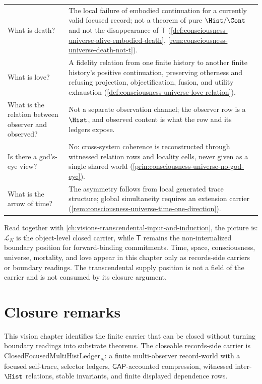 \begin{longtable}{p{}p{}}
What is death? & The local failure of embodied continuation for a currently valid focused record; not a theorem of pure $\Hist/\Cont$ and not the disappearance of $\mathsf{T}$ (\autoref{def:consciousness-universe-alive-embodied-death}, \autoref{rem:consciousness-universe-death-not-t}). \\
What is love? & A fidelity relation from one finite history to another finite history's positive continuation, preserving otherness and refusing projection, objectification, fusion, and utility exhaustion (\autoref{def:consciousness-universe-love-relation}). \\
What is the relation between observer and observed? & Not a separate observation channel; the observer row is a $\Hist$, and observed content is what the row and its ledgers expose. \\
Is there a god's-eye view? & No: cross-system coherence is reconstructed through witnessed relation rows and locality cells, never given as a single shared world (\autoref{prin:consciousness-universe-no-god-eye}). \\
What is the arrow of time? & The asymmetry follows from local generated trace structure; global simultaneity requires an extension carrier (\autoref{rem:consciousness-universe-time-one-direction}). \\
\bottomrule
\end{longtable}

\begin{remark}
\label{rem:consciousness-universe-continuity-with-transcendental}
Read together with \autoref{ch:visions-transcendental-input-and-induction}, the picture is: $\mathcal{L}_N$ is the object-level closed carrier, while $\mathsf{T}$ remains the non-internalized boundary position for forward-binding commitments. Time, space, consciousness, universe, mortality, and love appear in this chapter only as records-side carriers or boundary readings. The transcendental supply position is not a field of the carrier and is not consumed by its closure argument.
\end{remark}

\section{Closure remarks}
\label{sec:consciousness-universe-closure}

This vision chapter identifies the finite carrier that can be closed without turning boundary readings into substrate theorems. The closeable records-side carrier is $\mathrm{ClosedFocusedMultiHistLedger}_N$: a finite multi-observer record-world with a focused self-trace, selector ledgers, $\mathsf{GAP}$-accounted compression, witnessed inter-$\Hist$ relations, stable invariants, and finite displayed dependence rows.

